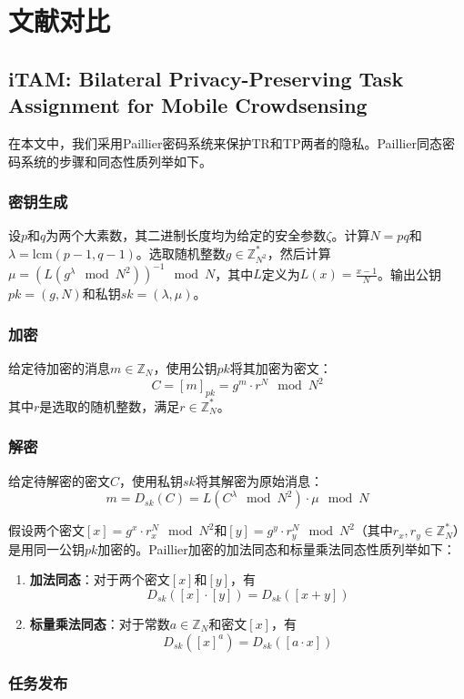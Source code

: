\chapter{文献对比}
\section{iTAM: Bilateral Privacy-Preserving Task  Assignment for Mobile Crowdsensing}

在本文中，我们采用Paillier密码系统来保护TR和TP两者的隐私。Paillier同态密码系统的步骤和同态性质列举如下。


\subsection{密钥生成}
设$p$和$q$为两个大素数，其二进制长度均为给定的安全参数$\zeta$。计算$N = pq$和$\lambda = \text{lcm}(p-1, q-1)$。选取随机整数$g \in \mathbb{Z}_{N^2}^*$，然后计算$\mu = \left(L(g^\lambda \mod N^2)\right)^{-1} \mod N$，其中$L$定义为$L(x) = \frac{x-1}{N}$。输出公钥$pk = (g, N)$和私钥$sk = (\lambda, \mu)$。


\subsection{加密}
给定待加密的消息$m \in \mathbb{Z}_N$，使用公钥$pk$将其加密为密文：
$$C = [m]_{pk} = g^m \cdot r^N \mod N^2$$
其中$r$是选取的随机整数，满足$r \in \mathbb{Z}_N^*$。


\subsection{解密}
给定待解密的密文$C$，使用私钥$sk$将其解密为原始消息：
$$m = D_{sk}(C) = L(C^\lambda \mod N^2) \cdot \mu \mod N$$


假设两个密文$[x] = g^x \cdot r_x^N \mod N^2$和$[y] = g^y \cdot r_y^N \mod N^2$（其中$r_x, r_y \in \mathbb{Z}_N^*$）是用同一公钥$pk$加密的。Paillier加密的加法同态和标量乘法同态性质列举如下：

\begin{enumerate}[leftmargin=*, nosep]
\item \textbf{加法同态}：对于两个密文$[x]$和$[y]$，有
$$D_{sk}([x] \cdot [y]) = D_{sk}([x + y])$$
\item \textbf{标量乘法同态}：对于常数$a \in \mathbb{Z}_N$和密文$[x]$，有
$$D_{sk}([x]^a) = D_{sk}([a \cdot x])$$
\end{enumerate}


\subsection{任务发布}

